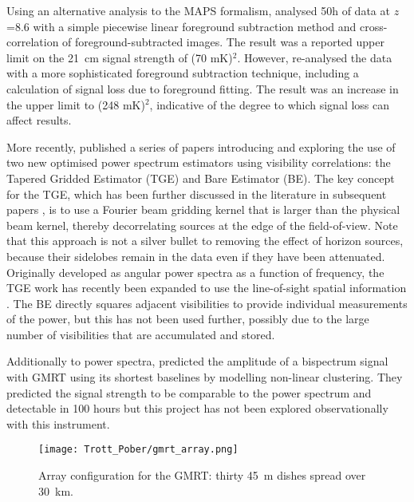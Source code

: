 Using an alternative analysis to the MAPS formalism, \cite{paciga11} analysed 50h of data at $z$=8.6 with a simple piecewise linear foreground subtraction method and cross-correlation of foreground-subtracted images.  The result was a reported upper limit on the 21~cm signal strength of (70 mK)$^2$.
However, \cite{paciga13} re-analysed the data with a more sophisticated foreground subtraction technique, including a calculation of signal loss due to foreground fitting. The result was an increase in the upper limit to (248 mK)$^2$, indicative of the degree to which signal loss can affect results.

More recently, \cite{chouduri14} published a series of papers introducing and exploring the use of two new optimised power spectrum estimators using visibility correlations: the Tapered Gridded Estimator (TGE) and Bare Estimator (BE). The key concept for the TGE, which has been further discussed in the literature in subsequent papers \cite{2016MNRAS.463.4093C}, is to use a Fourier beam gridding kernel that is larger than the physical beam kernel, thereby decorrelating sources at the edge of the field-of-view.
Note that this approach is not a silver bullet to removing the effect of horizon sources, because their sidelobes remain in the data even if they have been attenuated. Originally developed as angular power spectra as a function of frequency, the TGE work has recently been expanded to use the line-of-sight spatial information \cite{bharadwaj19}. The BE directly squares adjacent visibilities to provide individual measurements of the power, but this has not been used further, possibly due to the large number of visibilities that are accumulated and stored.

Additionally to power spectra, \cite{ali06} predicted the amplitude of a bispectrum signal with GMRT using its shortest baselines by modelling non-linear clustering. They predicted the signal strength to be comparable to the power spectrum and detectable in 100 hours but this project has not been explored observationally with this instrument.
\begin{figure}[ht]
\centering
\texttt{[image: Trott\_Pober/gmrt\_array.png]}
\caption{Array configuration for the GMRT: thirty 45~m dishes spread over 30~km.}\label{fig:gmrt}
\end{figure}


